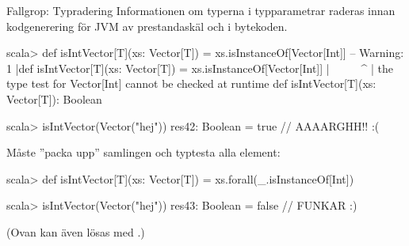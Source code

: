 





\begin{Slide}{Fallgrop: Typradering }\SlideFontSmall
Informationen om typerna i typparametrar raderas innan kodgenerering för JVM av prestandaskäl och  i bytekoden.
\vspace{-0.25em}\begin{REPL}
scala> def isIntVector[T](xs: Vector[T]) = xs.isInstanceOf[Vector[Int]]
-- Warning:
1 |def isIntVector[T](xs: Vector[T]) = xs.isInstanceOf[Vector[Int]]
  |                                    ^^^^^^^^^^^^^^^^^^^^^^^^^^^^
  |                the type test for Vector[Int] cannot be checked at runtime
def isIntVector[T](xs: Vector[T]): Boolean

scala> isIntVector(Vector("hej"))
res42: Boolean = true  // AAAARGHH!! :(
\end{REPL}
Måste ''packa upp'' samlingen och typtesta alla element:
\begin{REPL}
scala> def isIntVector[T](xs: Vector[T]) = xs.forall(_.isInstanceOf[Int])

scala> isIntVector(Vector("hej"))
res43: Boolean = false  // FUNKAR :)

\end{REPL}
(Ovan kan även lösas med .)

\end{Slide}

